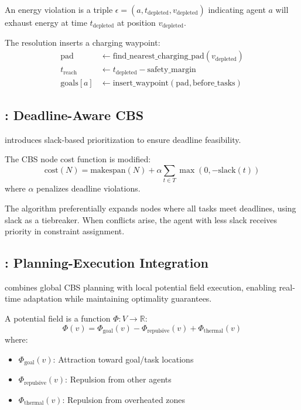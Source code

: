 \begin{definition}
An energy violation is a triple $\epsilon = (a, t_{\text{depleted}}, v_{\text{depleted}})$ indicating agent $a$ will exhaust energy at time $t_{\text{depleted}}$ at position $v_{\text{depleted}}$.
\end{definition}

The resolution inserts a charging waypoint:
\begin{align}
\text{pad} &\leftarrow \text{find\_nearest\_charging\_pad}(v_{\text{depleted}}) \\
t_{\text{reach}} &\leftarrow t_{\text{depleted}} - \text{safety\_margin} \\
\text{goals}[a] &\leftarrow \text{insert\_waypoint}(\text{pad}, \text{before\_tasks})
\end{align}

\subsection{\deadline{}: Deadline-Aware CBS}

\deadline{} introduces slack-based prioritization to ensure deadline feasibility.

\begin{definition}
The CBS node cost function is modified:
\begin{equation}
\text{cost}(N) = \text{makespan}(N) + \alpha \sum_{t \in T} \max(0, -\text{slack}(t))
\end{equation}
where $\alpha$ penalizes deadline violations.
\end{definition}

The algorithm preferentially expands nodes where all tasks meet deadlines, using slack as a tiebreaker. When conflicts arise, the agent with less slack receives priority in constraint assignment.

\subsection{\hybridcbs{}: Planning-Execution Integration}

\hybridcbs{} combines global CBS planning with local potential field execution, enabling real-time adaptation while maintaining optimality guarantees.

\begin{definition}
A potential field is a function $\Phi: V \rightarrow \mathbb{R}$:
\begin{equation}
\Phi(v) = \Phi_{\text{goal}}(v) - \Phi_{\text{repulsive}}(v) + \Phi_{\text{thermal}}(v)
\end{equation}
where:
\begin{itemize}
    \item $\Phi_{\text{goal}}(v)$: Attraction toward goal/task locations
    \item $\Phi_{\text{repulsive}}(v)$: Repulsion from other agents
    \item $\Phi_{\text{thermal}}(v)$: Repulsion from overheated zones
\end{itemize}
\end{definition}


